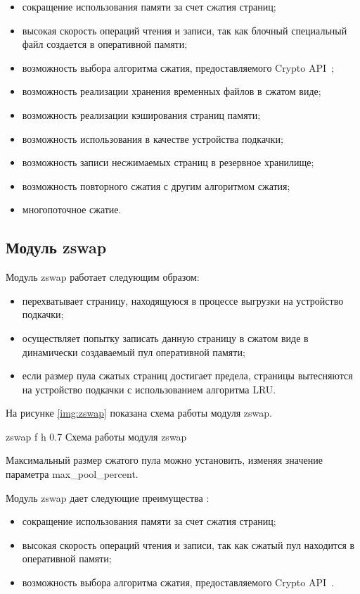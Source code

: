 \begin{itemize}
	\item сокращение использования памяти за счет сжатия страниц;
	\item высокая скорость операций чтения и записи, так как блочный специальный файл создается в оперативной памяти;
    \item возможность выбора алгоритма сжатия, предоставляемого Crypto API~\cite{crypto};
    \item возможность реализации хранения временных файлов в сжатом виде;
    \item возможность реализации кэширования страниц памяти;
    \item возможность использования в качестве устройства подкачки;
    \item возможность записи несжимаемых страниц в резервное хранилище;
    \item возможность повторного сжатия с другим алгоритмом сжатия;
    \item многопоточное сжатие.
\end{itemize}

\subsection{Модуль zswap}

Модуль zswap работает следующим образом:

\begin{itemize}
    \item перехватывает страницу, находящуюся в процессе выгрузки на устройство подкачки;
    \item осуществляет попытку записать данную страницу в сжатом виде в динамически создаваемый пул оперативной памяти;
    \item если размер пула сжатых страниц достигает предела, страницы вытесняются на устройство подкачки с использованием алгоритма LRU.
\end{itemize}

На рисунке \ref{img:zswap} показана схема работы модуля zswap.

    {zswap}
    {f}
    {h}
    {0.7\textwidth}
    {Схема работы модуля zswap}

Максимальный размер сжатого пула можно установить, изменяя значение параметра max\_pool\_percent.

Модуль zswap дает следующие преимущества \cite{zswap}:

\begin{itemize}
	\item сокращение использования памяти за счет сжатия страниц;
	\item высокая скорость операций чтения и записи, так как сжатый пул находится в оперативной памяти;
    \item возможность выбора алгоритма сжатия, предоставляемого Crypto API~\cite{crypto}.
\end{itemize}

